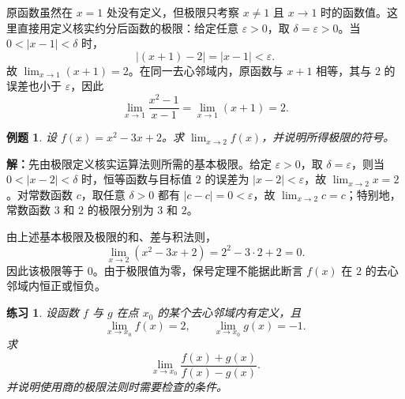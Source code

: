 \documentclass[UTF8,fontset=fandol,11pt]{ctexart}
\newtheorem{example}[definition]{例题}
\newtheorem{exercise}[definition]{练习}
\begin{document}
原函数虽然在 $x=1$ 处没有定义，但极限只考察 $x\neq1$ 且 $x\to1$ 时的函数值。这里直接用定义核实约分后函数的极限：给定任意 $\varepsilon>0$，取 $\delta=\varepsilon>0$。当 $0<|x-1|<\delta$ 时，
\[
|(x+1)-2|=|x-1|<\varepsilon.
\]
故 $\lim_{x\to1}(x+1)=2$。在同一去心邻域内，原函数与 $x+1$ 相等，其与 $2$ 的误差也小于 $\varepsilon$，因此
\[
\lim_{x\to1}\frac{x^2-1}{x-1}=\lim_{x\to1}(x+1)=2.
\]\par
\begin{example}
设 $f(x)=x^2-3x+2$。求 $\lim_{x\to2}f(x)$，并说明所得极限的符号。
\end{example}
\par\noindent\textbf{解：}先由极限定义核实运算法则所需的基本极限。给定 $\varepsilon>0$，取 $\delta=\varepsilon$，则当 $0<|x-2|<\delta$ 时，恒等函数与目标值 $2$ 的误差为 $|x-2|<\varepsilon$，故 $\lim_{x\to2}x=2$。对常数函数 $c$，取任意 $\delta>0$ 都有 $|c-c|=0<\varepsilon$，故 $\lim_{x\to2}c=c$；特别地，常数函数 $3$ 和 $2$ 的极限分别为 $3$ 和 $2$。

由上述基本极限及极限的和、差与积法则，
\[
\lim_{x\to2}(x^2-3x+2)=2^2-3\cdot2+2=0.
\]
因此该极限等于 $0$。由于极限值为零，保号定理不能据此断言 $f(x)$ 在 $2$ 的去心邻域内恒正或恒负。\par
\begin{exercise}
\label{mathagent:exercise:b4c9c9a1fb82bcef052fdbf6e1539831ed88cee016dbcbf83a50e5e8d2311be0}
设函数 $f$ 与 $g$ 在点 $x_0$ 的某个去心邻域内有定义，且
\[
\lim_{x\to x_0}f(x)=2,
\qquad
\lim_{x\to x_0}g(x)=-1.
\]
求
\[
\lim_{x\to x_0}\frac{f(x)+g(x)}{f(x)-g(x)}.
\]
并说明使用商的极限法则时需要检查的条件。
\end{exercise}
\end{document}
